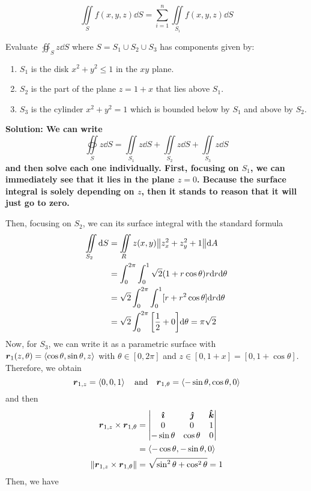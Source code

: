\[ \iint\limits_S f(x,y,z)\dd S = \sum_{i=1}^n \iint\limits_{S_i}f(x,y,z)\dd S\]
\begin{example}
    Evaluate $\oiint_S z\dd S$ where $S=S_1\cup S_2\cup S_3$ has components given by:
    \begin{enumerate}
        \item $S_1$ is the disk $x^2+y^2\leq 1$ in the $xy$ plane.
        \item $S_2$ is the part of the plane $z=1+x$ that lies above $S_1$.
        \item $S_3$ is the cylinder $x^2+y^2=1$ which is bounded below by $S_1$ and above by $S_2$.
    \end{enumerate}
    \bf{Solution:} We can write 
    \[ \oiint\limits_{S} z\dd S =\iint\limits_{S_1} z\dd S+\iint\limits_{S_2} z\dd S+\iint\limits_{S_3} z\dd S \]
    and then solve each one individually. First, focusing on $S_1$, we can immediately see that it lies in the plane $z=0$. Because the surface integral is solely depending on $z$, then it stands to reason that it will just go to zero. \par
    Then, focusing on $S_2$, we can its surface integral with the standard formula
    \begin{align*}
        \iint\limits_{S_2} \dd S &= \iint\limits_R z(x,y)\norm{z_x^2+z_y^2+1}\dd A \\
        &= \int_0^{2\pi}\int_0^1 \sqrt{2}(1+r\cos\theta)r\dd r\dd \theta \\
        &= \sqrt{2}\int_0^{2\pi}\int_0^1 [r+r^2\cos\theta]\dd r\dd \theta \\
        &= \sqrt{2}\int_0^{2\pi}\bqty{\frac{1}{2} + 0}\dd \theta = \pi\sqrt{2}
    \end{align*}
    Now, for $S_3$, we can write it as a parametric surface with $\boldsymbol{r}_1(z, \theta) = \left\langle \cos\theta, \sin\theta, z\right\rangle$ with $\theta\in[0, 2\pi]$ and $z\in[0,1+x] = [0, 1+\cos\theta]$. Therefore, we obtain
    \[ \boldsymbol{r}_{1,z } = \left\langle 0, 0, 1\right\rangle \quad \text{and}\quad \boldsymbol{r}_{1,\theta} = \left\langle -\sin\theta, \cos\theta, 0\right\rangle \]
    and then
    \begin{align*}
        \boldsymbol{r}_{1,z}\times\boldsymbol{r}_{1,\theta} &= \begin{vmatrix} \boldsymbol{\hat{\imath}} & \boldsymbol{\hat{\jmath}} & \boldsymbol{\hat{k}} \\ 0 & 0 & 1 \\ -\sin\theta & \cos\theta & 0\end{vmatrix} \\
        &= \left\langle-\cos\theta, -\sin\theta, 0\right\rangle \\
        \norm{\boldsymbol{r}_{1,z}\times\boldsymbol{r}_{1,\theta}} &= \sqrt{\sin^2\theta + \cos^2\theta} = 1
    \end{align*}
    Then, we have
    \begin{align*}

\end{align*}
\end{example}
